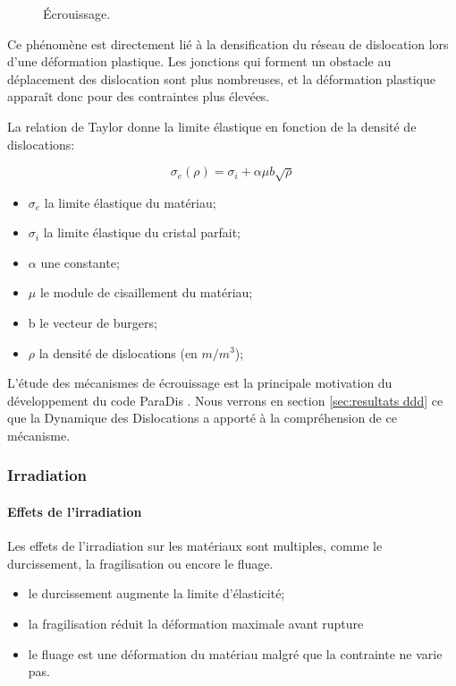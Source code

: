 \documentclass[11pt,class=article,float=false,crop=false]{standalone}
\begin{document}
\begin{figure}[H]
	\centering
	\caption{Écrouissage.}
	\label{fig:ecrouissage}
\end{figure}

Ce phénomène est directement lié à la densification du réseau de dislocation lors d'une déformation plastique. Les jonctions qui forment un obstacle au déplacement des dislocation sont plus nombreuses, et la déformation plastique apparaît donc pour des contraintes plus élevées.

La relation de Taylor  donne la limite élastique en fonction de la densité de dislocations:

\begin{equation}
\sigma _e (\rho) = \sigma _i + \alpha \mu b \sqrt{\rho}
\end{equation}
\begin{itemize}
	\item $\sigma _e$ la limite élastique du matériau;
	\item $\sigma _i$ la limite élastique du cristal parfait;
	\item $\alpha$ une constante;
	\item $\mu$ le module de cisaillement du matériau;
	\item b le vecteur de burgers;
	\item $\rho$ la densité de dislocations (en $m/m^3$);
\end{itemize}

L'étude des mécanismes de écrouissage est la principale motivation du développement du code ParaDis . Nous verrons en section \ref{sec:resultats ddd} ce que la Dynamique des Dislocations a apporté à la compréhension de ce mécanisme.

\subsubsection{Irradiation}

\paragraph{Effets de l'irradiation}

Les effets de l'irradiation sur les matériaux sont multiples, comme le durcissement, la fragilisation ou encore le fluage. 
\begin{itemize}
	\item le durcissement augmente la limite d'élasticité;
	\item la fragilisation réduit la déformation maximale avant rupture
	\item le fluage est une déformation du matériau malgré que la contrainte ne varie pas.
\end{itemize}
\end{document}
